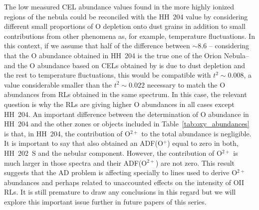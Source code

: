 \documentclass[twocolumn,linenumbers]{aastex63}
\newcommand{\eduardo}[1]{{\color{teal}E: #1}}
\newcommand{\jorge}[1]{{\color{magenta}J: #1}}
\begin{document}
The low measured CEL abundance values found in the more highly ionized regions of the nebula could be reconciled with the HH~204 value by considering different small proportions of O depletion onto dust grains in addition to small contributions from other phenomena as, for example, temperature fluctuations. In this context, if we assume that half of the difference between $\sim 8.6$ -- considering that the O abundance obtained in HH~204 is the true one of the Orion Nebula-- and the O abundance based on CELs obtained by  \citet[][]{Esteban04} is due to dust depletion and the rest to temperature fluctuations, this would be compatible with $t^2\sim 0.008$, a value considerable smaller than the $t^2\sim 0.022$ necessary to match the O abundances from RLs obtained in the same spectrum. In this case, the relevant question is why the RLs are giving higher O abundances in all cases except HH~204. An important difference between the determination of O abundance in HH~204 and the other zones or objects included in Table~\ref{tab:oxy_abundances} is that, in HH~204, the contribution of O$^{2+}$ to the total abundance is negligible. It is important to say that \citet{mesadelgado09} also obtained an  ADF(O$^{+}$) equal to zero in both, HH~202~S and the nebular component. However, the contribution of O$^{2+}$ is much larger in those spectra and their ADF(O$^{2+}$) are not zero. This result suggests that the AD problem is affecting specially to lines used to derive O$^{2+}$ abundances and perhaps related to unaccounted effects on the intensity of O\thinspace II RLs.  It is still premature to draw any conclusions in this regard but we will explore this important issue further in future papers of this series. %

\end{document}
